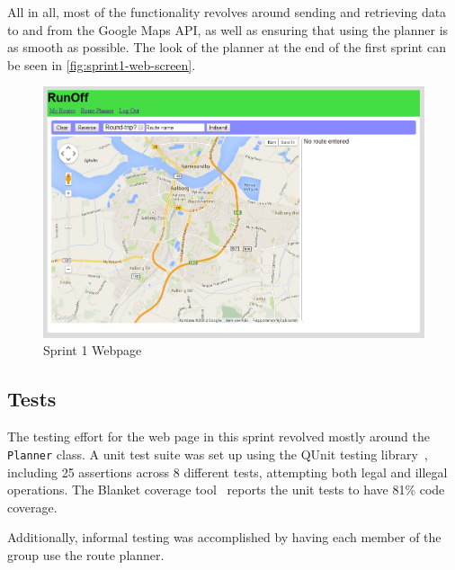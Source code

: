 All in all, most of the functionality revolves around sending and retrieving data to and from the Google Maps \ac{API}, as well as ensuring that using the planner is as smooth as possible. The look of the planner at the end of the first sprint can be seen in \autoref{fig:sprint1-web-screen}.

\begin{figure}[!ht]
	\centering
	\includegraphics[width=\textwidth]{img/webplanner1.png}
	\caption{Sprint 1 Webpage}
	\label{fig:sprint1-web-screen}
\end{figure}

\subsection{Tests}

The testing effort for the web page in this sprint revolved mostly around the \texttt{Planner} class. A unit test suite was set up using the QUnit testing library~\citep{qunit}, including 25 assertions across 8 different tests, attempting both legal and illegal operations. The Blanket coverage tool~\citep{blanketjs} reports the unit tests to have 81\% code coverage.

Additionally, informal testing was accomplished by having each member of the group use the route planner.

